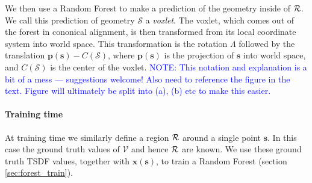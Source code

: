 \documentclass[10pt,twocolumn,letterpaper]{article}
\makeatletter
\renewcommand*{\ie}{i.e.\@\xspace}
\newcommand{\pixelidx}{\mathbf{s}}
\newcommand{\voxelgrid}{\mathcal{V}}
\newcommand{\point}{\mathbf{p}}
\newcommand{\normal}{\mathbf{n}}
\newcommand{\updir}{\mathbf{u}}
\newcommand{\note}[1]{\textcolor{blue}{NOTE: #1}}
\newcommand{\remove}[1]{\textcolor{grey}{#1}}
\makeatother
\begin{document}

We then use a Random Forest to make a prediction of the geometry inside of $\mathcal{R}$.
We call this prediction of geometry $\mathcal{S}$ a \emph{voxlet}.
The voxlet, which comes out of the forest in cononical alignment, is then transformed from its local coordinate system into world space.
This transformation is the rotation $\Lambda$ followed by the translation $\mathbf{p}(\mathbf{\pixelidx}) - C(\mathcal{S})$, where $\mathbf{p}(\mathbf{\pixelidx})$ is the projection of $\pixelidx$ into world space, and $C(\mathcal{S})$ is the center of the voxlet. \note{This notation and explanation is a bit of a mess --- suggestions welcome! Also need to reference the figure in the text. Figure will ultimately be split into (a), (b) etc to make this easier.}


\paragraph{Training time}
At training time we similarly define a region $\mathcal{R}$ around a single point $\pixelidx$. In this case the ground truth values of $\voxelgrid$ and hence $\mathcal{R}$ are known. We use these ground truth TSDF values, together with $\mathbf{x}(\pixelidx)$, to train a Random Forest (section \ref{sec:forest_train}).
\end{document}
